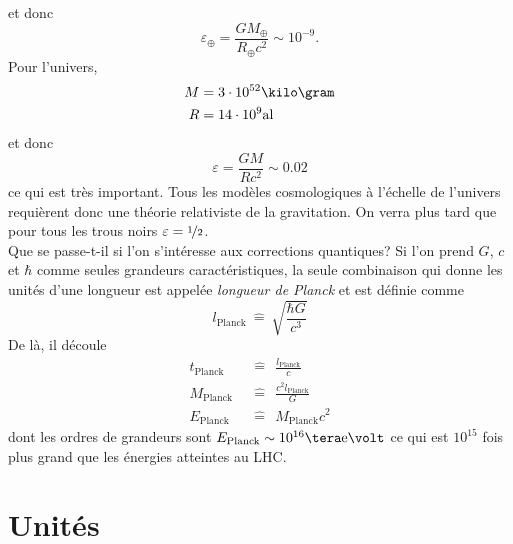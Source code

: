 \documentclass[a4paper,11pt]{report}
\theoremstyle{definition}
\theoremstyle{plain}
\theoremstyle{definition}
\theoremstyle{remark}
\begin{document}
        et donc
        \begin{equation}
            \varepsilon_\oplus = \frac{GM_\oplus}{R_\oplus c^2}\sim 10^{-9}.
        \end{equation}
        Pour l'univers,
        \begin{align*}
            M &= 3\cdot10^{52}\kilo\gram \\
            R &= 14\cdot10^{9}\text{al}
        \end{align*}
        et donc
        \begin{equation}
            \varepsilon = \frac{GM}{Rc^2}\sim 0.02
        \end{equation}
        ce qui est très important. Tous les modèles cosmologiques à l'échelle de l'univers requièrent donc une théorie relativiste de la gravitation. On verra plus tard que pour tous les trous noirs $\varepsilon = \nicefrac{1}{2}$.\\
        
        Que se passe-t-il si l'on s'intéresse aux corrections quantiques? Si l'on prend $G$, $c$ et $\hbar$ comme seules grandeurs caractéristiques, la seule combinaison qui donne les unités d'une longueur est appelée \textit{longueur de Planck} et est définie comme
        \begin{equation*}
            l_{\text{Planck}} ~\hat{=}~ \sqrt{\frac{\hbar G}{c^3}}
        \end{equation*}
        De là, il découle
        \begin{align*}
            t_{\text{Planck}} ~&~\hat{=}~~ \frac{l_{\text{Planck}}}{c} \\
            M_{\text{Planck}} ~&~\hat{=}~~ \frac{c^2l_{\text{Planck}}}{G} \\
            E_{\text{Planck}} ~&~\hat{=}~~ M_{\text{Planck}}c^2
        \end{align*}
        dont les ordres de grandeurs sont $E_{\text{Planck}}\sim10^{16}\tera\text{e}\volt$ ce qui est $10^{15}$ fois plus grand que les énergies atteintes au LHC.
        
    \section{Unités}
    
\end{document}
